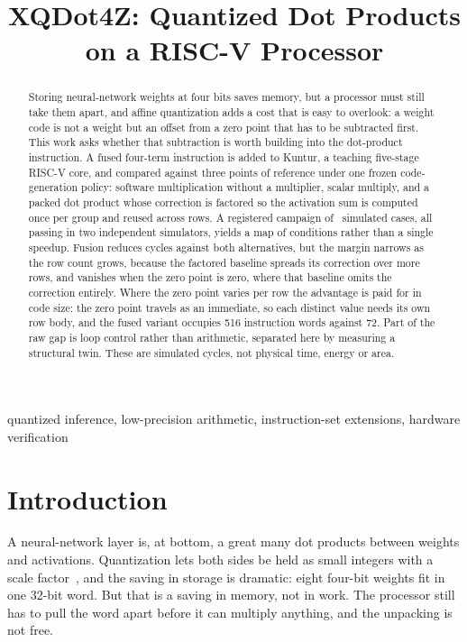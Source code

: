 \title{XQDot4Z: Quantized Dot Products\\on a RISC-V Processor}
\author{}
\maketitle
\begin{abstract}
Storing neural-network weights at four bits saves memory, but a processor must
still take them apart, and affine quantization adds a cost that is easy to
overlook: a weight code is not a weight but an offset from a zero point that has
to be subtracted first. This work asks whether that subtraction is worth
building into the dot-product instruction. A fused four-term instruction is
added to Kuntur, a teaching five-stage RISC-V core, and compared against three
points of reference under one frozen code-generation policy: software
multiplication without a multiplier, scalar multiply, and a packed dot product
whose correction is factored so the activation sum is computed once per group
and reused across rows. A registered campaign of \CampaignCases\ simulated cases, all
passing in two independent simulators, yields a map of conditions rather than a
single speedup. Fusion reduces cycles against both alternatives, but the margin
narrows as the row count grows, because the factored baseline spreads its
correction over more rows, and vanishes when the zero point is zero, where that
baseline omits the correction entirely. Where the zero point varies per row the
advantage is paid for in code size: the zero point travels as an immediate, so
each distinct value needs its own row body, and the fused variant occupies 516
instruction words against 72. Part of the raw gap is loop control rather than
arithmetic, separated here by measuring a structural twin. These are simulated
cycles, not physical time, energy or area.
\end{abstract}
\begin{IEEEkeywords}
quantized inference, low-precision arithmetic, instruction-set extensions,
hardware verification
\end{IEEEkeywords}
\suppressfloats[t]

\section{Introduction}
A neural-network layer is, at bottom, a great many dot products between
weights and activations. Quantization lets both sides be held as small integers
with a scale factor~\cite{jacob}, and the saving in storage is dramatic: eight
four-bit weights fit in one 32-bit word. But that is a saving in memory, not in
work. The processor still has to pull the word apart before it can multiply
anything, and the unpacking is not free.

